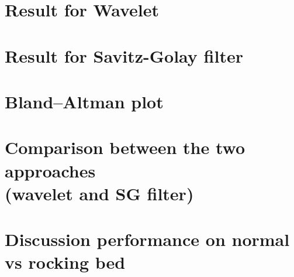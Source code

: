 \section{Result for Wavelet }
\section{Result for Savitz-Golay filter }
\section{Bland–Altman plot}
\section{Comparison between the two approaches \\ (wavelet and SG filter)}
\section{Discussion performance on normal vs rocking bed }